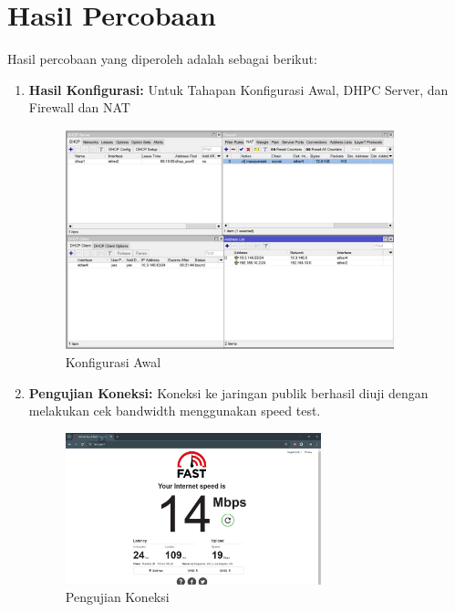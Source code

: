 \section*{Hasil Percobaan} %

Hasil percobaan yang diperoleh adalah sebagai berikut:

\begin{enumerate}
    \item \textbf{Hasil Konfigurasi:} Untuk Tahapan Konfigurasi Awal, DHPC Server, dan Firewall dan NAT
    
    \begin{figure}[H]
        \centering
        \includegraphics[width=0.9\textwidth]{img/Konfigurasi_Percobaan_1.jpeg}
        \caption{Konfigurasi Awal}
        \label{fig:konfigurasi_awal}
    \end{figure}

    \item \textbf{Pengujian Koneksi:} Koneksi ke jaringan publik berhasil diuji dengan melakukan cek bandwidth menggunakan speed test.
    
    \begin{figure}[H]
        \centering
        \includegraphics[width=0.7\textwidth]{img/Hasil Tanpa Pengaturan.jpeg}
        \caption{Pengujian Koneksi}
        \label{fig:pengujian_koneksi}
    \end{figure}


\end{enumerate}
